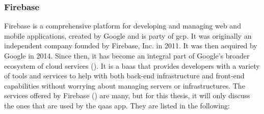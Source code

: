 \subsubsection{Firebase}
Firebase is a comprehensive platform for developing and managing web and mobile applications, created by
Google and is party of \acrshort{gcp}. It was originally an independent company founded by Firebase, Inc.
in 2011. It was then acquired by Google in 2014. Since then, it has become an integral part of Google's
broader ecosystem of cloud services (\cite{firebase}). It is a \acrshort{baas} that provides developers with a
variety of tools and services to help with both back-end infrastructure and front-end capabilities without worrying
about managing servers or infrastructures. The services offered by Firebase (\textit{\cite{firebaseproducts}}) are
many, but for this thesis, it will only discuss the ones that are used by the \acrshort{qaas} app. They are listed
in the following:
